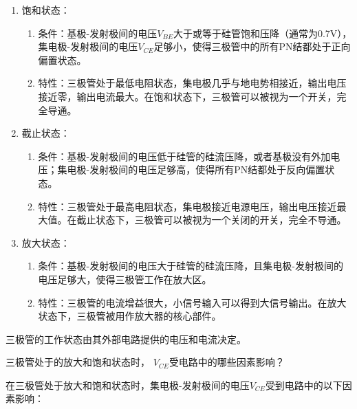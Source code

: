 \documentclass[dvipsnames, svgnames,a4paper,11pt]{article}
\begin{document}
		\begin{enumerate}
			\item 饱和状态：
				\begin{enumerate}
					\item 条件：基极-发射极间的电压$V_{BE}$大于或等于硅管饱和压降（通常为0.7V），集电极-发射极间的电压$V_{CE}$足够小，使得三极管中的所有PN结都处于正向偏置状态。
					\item 特性：三极管处于最低电阻状态，集电极几乎与地电势相接近，输出电压接近零，输出电流最大。在饱和状态下，三极管可以被视为一个开关，完全导通。
				\end{enumerate}
			
			\item 截止状态：
				\begin{enumerate}
					\item 条件：基极-发射极间的电压低于硅管的硅流压降，或者基极没有外加电压；集电极-发射极间的电压足够高，使得所有PN结都处于反向偏置状态。
					\item 特性：三极管处于最高电阻状态，集电极接近电源电压，输出电压接近最大值。在截止状态下，三极管可以被视为一个关闭的开关，完全不导通。
				\end{enumerate}
			
			\item 放大状态：
				\begin{enumerate}
					\item 条件：基极-发射极间的电压大于硅管的硅流压降，且集电极-发射极间的电压足够大，使得三极管工作在放大区。
					\item 特性：三极管的电流增益很大，小信号输入可以得到大信号输出。在放大状态下，三极管被用作放大器的核心部件。
				\end{enumerate}
			
		\end{enumerate}


		三极管的工作状态由其外部电路提供的电压和电流决定。




		\begin{question}
			三极管处于的放大和饱和状态时， $V_{CE}$受电路中的哪些因素影响？
		\end{question}

		
		在三极管处于放大和饱和状态时，集电极-发射极间的电压$V_{CE}$受到电路中的以下因素影响：
\end{document}
